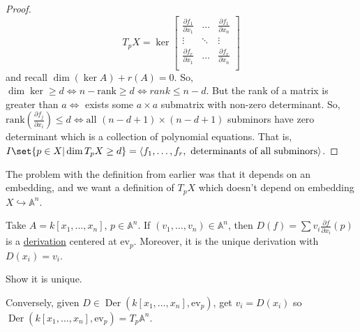 \documentclass{article}
\newcommand{\A}{\mathbb{A}}
\DeclareMathOperator{\Der}{Der}
\begin{document}
\begin{proof}
    \begin{equation*}
        T_p X = \ker
        \begin{bmatrix}
            \frac{\partial f_1}{\partial x_1} & \dots & \frac{\partial f_1}{\partial x_n} \\
            \vdots & \ddots & \vdots \\
            \frac{\partial f_r}{\partial x_1} & \dots & \frac{\partial f_r}{\partial x_n} \\
        \end{bmatrix}
    \end{equation*}
    and recall $\dim(\ker A) + r(A) = 0$.
    So, $\dim \ker \geq d \iff n - \text{rank} \geq d \iff rank \leq n - d$.
    But the rank of a matrix is greater than $a \iff$ exists some $a \times a$ submatrix with non-zero determinant.
    So, $\text{rank}(\frac{\partial f_j}{\partial x_i}) \leq d \iff \text{all } (n - d + 1) \times (n - d + 1)$ subminors have zero determinant which is a collection of polynomial equations.
    That is, $I \set{p \in X | \dim T_p X \geq d} = \langle f_1, \dotsc, f_r, \text{ determinants of all subminors} \rangle$.
\end{proof}
The problem with the definition from earlier was that it depends on an embedding, and we want a definition of $T_p X$ which doesn't depend on embedding $X \hookrightarrow \A^n$.
\begin{eg}
    Take $A = k[x_1, \dotsc, x_n]$, $p \in \A^n$.
    If $(v_1, \dotsc, v_n) \in \A^n$, then $D(f) = \sum v_i \frac{\partial f}{\partial x_i} (p)$ is a \hyperlink{def:derivation}{derivation} centered at $\text{ev}_p$.
    Moreover, it is the unique derivation with $D(x_i) = v_i$.
\end{eg}
\begin{ex}
    Show it is unique.
\end{ex}
Conversely, given $D \in \Der(k[x_1, \dotsc, x_n], \text{ev}_p)$, get $v_i = D(x_i)$ so $\Der(k[x_1, \dotsc, x_n], \text{ev}_p) = T_p \A^n$.
\end{document}
